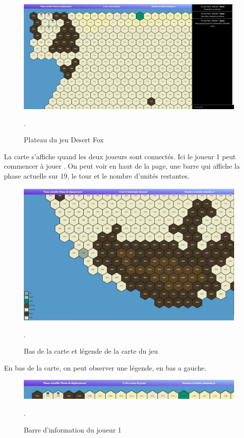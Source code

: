 \begin{figure}[H]
\centering
\includegraphics[scale=0.35]{data/plateau du jeu.jpg}
\caption{Plateau du jeu Desert Fox}.
\end{figure}

La carte s'affiche quand les deux joueurs sont connectés. Ici le joueur 1 peut commencer à jouer
. On peut voir en haut de la page, une barre qui affiche la phase actuelle sur 19, le tour  et le nombre d'unités restantes.


\begin{figure}[H]
\centering
\includegraphics[scale=0.35]{data/justification2.jpg}
\caption{Bas de la carte et légende de la carte du jeu}.
\end{figure}
En bas de la carte, on peut observer une légende, en bas a gauche.\\
\begin{figure}[H]
\centering
\includegraphics[scale=0.4]{data/player 1 acces.jpg}
\caption{Barre d'information du joueur 1}.
\end{figure}


